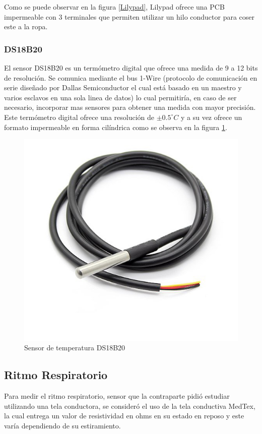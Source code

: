 Como se puede observar en la figura \ref{Lilypad}, Lilypad ofrece una PCB impermeable con 3 terminales que permiten utilizar un hilo conductor para coser este a la ropa.

\subsubsection{DS18B20}
El sensor DS18B20\cite{temp} es un termómetro digital que ofrece una medida de 9 a 12 bits de resolución. Se comunica mediante el bus 1-Wire (protocolo de comunicación en serie diseñado por Dallas Semiconductor el cual está basado en un maestro y varios esclavos en una sola linea de datos) lo cual permitiría, en caso de ser necesario, incorporar mas sensores para obtener una medida con mayor precisión. 
Este termómetro digital ofrece una resolución de $\pm0.5^\circ C$ y a su vez ofrece un formato impermeable en forma cilíndrica como se observa en la figura \ref{DS18B20}.

\begin{figure}[H]
	\centering
	\includegraphics[scale=0.2]{figuras/sensor/t/ds18.jpg}
	\caption{Sensor de temperatura DS18B20}
	\label{DS18B20}
\end{figure}

\subsection{Ritmo Respiratorio}
Para medir el ritmo respiratorio, sensor que la contraparte pidió estudiar utilizando una tela conductora, se consideró el uso de la tela conductiva MedTex, la cual entrega un valor de resistividad en ohms en su estado en reposo y este varía dependiendo de su estiramiento.\\


